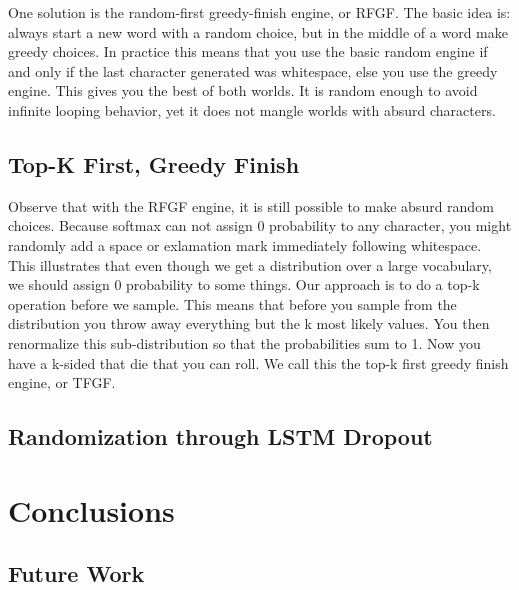 \documentclass{article}
\begin{document}
One solution is the random-first greedy-finish engine, or RFGF. The basic idea is: always start a new word with a random choice, but in the middle of a word make greedy choices. In practice this means that you use the basic random engine if and only if the last character generated was whitespace, else you use the greedy engine. This gives you the best of both worlds. It is random enough to avoid infinite looping behavior, yet it does not mangle worlds with absurd characters.

\subsection{Top-K First, Greedy Finish}
Observe that with the RFGF engine, it is still possible to make absurd random choices. Because softmax can not assign 0 probability to any character, you might randomly add a space or exlamation mark immediately following whitespace. This illustrates that even though we get a distribution over a large vocabulary, we should assign 0 probability to some things. Our approach is to do a top-k operation before we sample. This means that before you sample from the distribution you throw away everything but the k most likely values. You then renormalize this sub-distribution so that the probabilities sum to 1. Now you have a k-sided that die that you can roll. We call this the top-k first greedy finish engine, or TFGF.

\subsection{Randomization through LSTM Dropout}

\section{Conclusions}

\subsection{Future Work}



\end{document}
